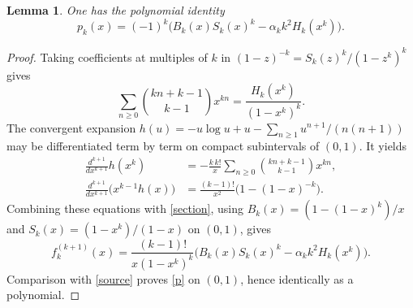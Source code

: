 \documentclass[11pt]{article}
\newtheorem{lemma}{Lemma}
\begin{document}
\begin{lemma}\label{formula}
One has the polynomial identity
\begin{equation}\label{p}
 p_k(x)=(-1)^k\bigl(B_k(x)S_k(x)^k-\alpha_k k^2H_k(x^k)\bigr).
\end{equation}
\end{lemma}
\begin{proof}
Taking coefficients at multiples of $k$ in
$(1-z)^{-k}=S_k(z)^k/(1-z^k)^k$ gives
\begin{equation}\label{section}
 \sum_{n\ge0}\binom{kn+k-1}{k-1}x^{kn}
       =\frac{H_k(x^k)}{(1-x^k)^k}.
\end{equation}
The convergent expansion
$h(u)=-u\log u+u-\sum_{n\ge1}u^{n+1}/(n(n+1))$
may be differentiated term by term on compact subintervals of $(0,1)$.
It yields
\begin{align*}
 \frac{d^{k+1}}{dx^{k+1}}h(x^k)
   &=-\frac{k\,k!}{x}\sum_{n\ge0}\binom{kn+k-1}{k-1}x^{kn},\\
 \frac{d^{k+1}}{dx^{k+1}}\bigl(x^{k-1}h(x)\bigr)
   &=\frac{(k-1)!}{x^2}\bigl(1-(1-x)^{-k}\bigr).
\end{align*}
Combining these equations with \eqref{section}, using
$B_k(x)=(1-(1-x)^k)/x$ and
$S_k(x)=(1-x^k)/(1-x)$ on $(0,1)$, gives
\[
 f_k^{(k+1)}(x)=\frac{(k-1)!}{x(1-x^k)^k}
 \bigl(B_k(x)S_k(x)^k-\alpha_k k^2H_k(x^k)\bigr).
\]
Comparison with \eqref{source} proves \eqref{p} on $(0,1)$, hence
identically as a polynomial.
\end{proof}
\end{document}
